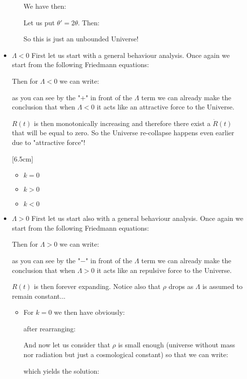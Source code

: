 \begin{itemize}
\begin{itemize}
				We have then:
				
				Let us put $\theta'=2\theta$. Then:
				
				So this is just an unbounded Universe!
		\end{itemize}
	
		\item $\Lambda<0$
			First let us start with a general behaviour analysis. Once again we start from the following Friedmann equations:
			
			Then for $\Lambda <0$ we can write:
			
			as you can see by the "$+$" in front of the $\Lambda$ term we can already make the conclusion that when $\Lambda<0$ it acts like an attractive force to the Universe.
			
			$R(t)$ is then monotonically increasing and therefore there exist a $\dot{R}(t)$ that will be equal to zero. So the Universe re-collapse happens even earlier due to "attractive force"!
		
			[6.5cm]
			\begin{itemize}
				\item $k=0$
				\item $k>0$
				\item $k<0$
			\end{itemize}
	
		\item $\Lambda>0$
			First let us start also with a general behaviour analysis. Once again we start from the following Friedmann equations:
			
			Then for $\Lambda >0$ we can write:
			
			as you can see by the "$-$" in front of the $\Lambda$ term we can already make the conclusion that when $\Lambda>0$ it acts like an repulsive force to the Universe.
			
			$R(t)$ is then forever expanding. Notice also that $\rho$ drops as $\Lambda$ is assumed to remain constant...
			
			
			\begin{itemize}
				\item For $k=0$ we then have obviously:
				
				after rearranging:
				
				And now let us consider that $\rho$ is small enough (universe without mass nor radiation but just a cosmological constant) so that we can write:
				
				which yields the solution:
				

\end{itemize}
\end{itemize}
